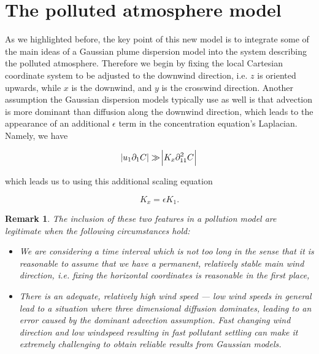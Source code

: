 \documentclass[11pt]{article}
\newtheorem{remark}{Remark}
\begin{document}
\section{The polluted atmosphere model} \label{eqsdescribingatmpluspollution}

As we highlighted before, the key point of this new model is to integrate some of the main ideas of a Gaussian plume dispersion model into the system describing the polluted atmosphere. Therefore we begin by fixing the local Cartesian coordinate system to be adjusted to the downwind direction, i.e. $z$ is oriented upwards, while $x$ is the downwind, and $y$ is the crosswind direction. Another assumption the Gaussian dispersion models typically use as well is that advection is more dominant than diffusion along the downwind direction, which leads to the appearance of an additional $\epsilon$ term in the concentration equation's Laplacian. Namely, we have

\begin{equation} \abs{u_1 \partial_{1} C} \gg \abs{ K_x \partial_{11} ^2 C }\end{equation}

which leads us to using this additional scaling equation

\begin{equation} \label{ksepsk1} K_x = \epsilon K_1.\end{equation}

\begin{remark} \normalfont
  The inclusion of these two features in a pollution model are legitimate when the following circumstances hold:
  \begin{itemize}
    \item We are considering a time interval which is not too long in the sense that it is reasonable to assume that we have a permanent, relatively stable main wind direction, i.e. fixing the horizontal coordinates is reasonable in the first place,
    \item There is an adequate, relatively high wind speed --- low wind speeds in general lead to a situation where three dimensional diffusion dominates, leading to an error caused by the dominant advection assumption. Fast changing wind direction and low windspeed resulting in fast pollutant settling can make it extremely challenging to obtain reliable results from Gaussian models.
  \end{itemize}
\end{remark}
\end{document}
